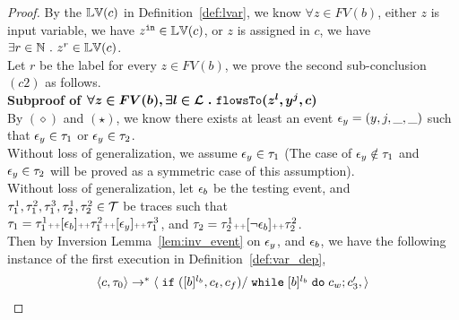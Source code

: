 \begin{proof}
By the $\mathbb{LV}(c)$ in Definition~\ref{def:lvar}, we know 
$\forall z \in FV(b)$, either $z$ is input variable, we have $z^{\mathtt{in}} \in \mathbb{LV}(c)$,
or $z$ is assigned in $c$, we have $\exists r \in \mathbb{N} ~.~   z^r \in \mathbb{LV}(c)$.
\\
Let $r$ be the label for every $z \in FV(b)$, we prove the second sub-conclusion
$(c2)$ as follows.
\\
\textbf{Subproof of $ \boldsymbol{\forall z \in FV(b), \exists l \in \mathcal{L} ~.~   \mathtt{flowsTo}(z^l, y^j, c)}$}
\\
By $(\diamond)$ and $(\star)$,
 we know there exists at least an event $\mathtt{\epsilon}_y = (y, j, \_, \_)$ such that
 $ \mathtt{\epsilon}_y \in \mathtt{\tau}_1$ or $\mathtt{\epsilon}_y \in \mathtt{\tau}_2$.
 \\
 Without loss of generalization, we assume $\mathtt{\epsilon}_y \in \mathtt{\tau}_1$ 
 (The case of $\mathtt{\epsilon}_y \notin \mathtt{\tau}_1$ and $\mathtt{\epsilon}_y \in \mathtt{\tau}_2$ will be proved as a symmetric case of this assumption).
 \\
 Without loss of generalization, let $\mathtt{\epsilon}_b$ be the testing event, 
 and $\mathtt{\tau}_1^1, \mathtt{\tau}_1^2, \mathtt{\tau}_1^3, \mathtt{\tau}_2^1, \mathtt{\tau}_2^2 \in \mathcal{T}$ be traces
 such that 
 \\
 $\mathtt{\tau}_1 = \mathtt{\tau}_1^1 {\scriptscriptstyle ++} [\mathtt{\epsilon}_b] {\scriptscriptstyle ++}  \mathtt{\tau}_1^2 {\scriptscriptstyle ++} [\mathtt{\epsilon}_y] {\scriptscriptstyle ++} \mathtt{\tau}_1^3$,
and $\mathtt{\tau}_2 = \mathtt{\tau}^1_2 {\scriptscriptstyle ++} [\neg\mathtt{\epsilon}_b] {\scriptscriptstyle ++}  \mathtt{\tau}^2_2$.
 \\
Then by Inversion Lemma~\ref{lem:inv_event} on 
$\mathtt{\epsilon}_y$, and $\mathtt{\epsilon}_b$,
we have the following instance of the first execution in Definition~\ref{def:var_dep},
\begin{equation}
	\label{eq:ctldep_exe1}
	\begin{array}{l}   
\langle {c}, \mathtt{\tau}_0 \rangle \rightarrow^{*} 
\langle \;\mathtt{if}\; ([b]^{l_b}, c_t, c_f) / \;\mathtt{while}\; [b]^{l_b} \;\mathtt{do}\; c_w;{c}_3', 
 \rangle
\end{array}
\end{equation}
\end{proof}
